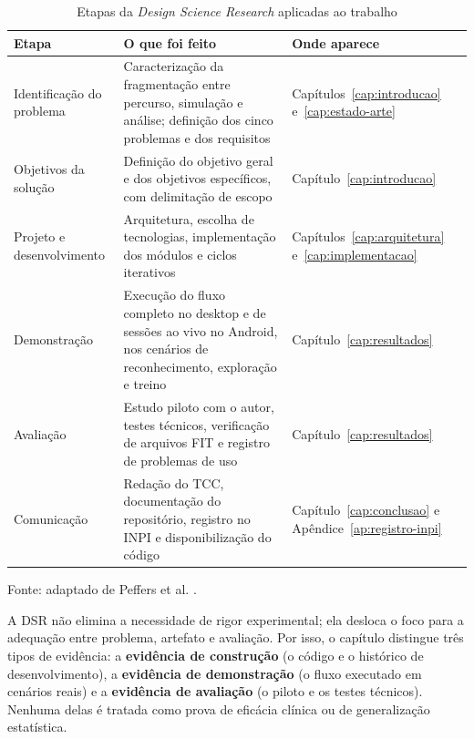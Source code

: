 \begin{table}[htbp]
    \centering
    \caption{Etapas da \textit{Design Science Research} aplicadas ao trabalho}
    \label{tab:dsr}
    \small
    \begin{tabular}{
        >{\raggedright\arraybackslash}p{3.4cm}
        >{\raggedright\arraybackslash}p{7.2cm}
        >{\raggedright\arraybackslash}p{4.0cm}
    }
        \toprule
        \textbf{Etapa} & \textbf{O que foi feito} & \textbf{Onde aparece} \\
        \midrule
        Identificação do problema &
        Caracterização da fragmentação entre percurso, simulação e análise;
        definição dos cinco problemas e dos requisitos &
        Capítulos~\ref{cap:introducao} e~\ref{cap:estado-arte} \\
        Objetivos da solução &
        Definição do objetivo geral e dos objetivos específicos, com
        delimitação de escopo &
        Capítulo~\ref{cap:introducao} \\
        Projeto e desenvolvimento &
        Arquitetura, escolha de tecnologias, implementação dos módulos e
        ciclos iterativos &
        Capítulos~\ref{cap:arquitetura} e~\ref{cap:implementacao} \\
        Demonstração &
        Execução do fluxo completo no desktop e de sessões ao vivo no Android,
        nos cenários de reconhecimento, exploração e treino &
        Capítulo~\ref{cap:resultados} \\
        Avaliação &
        Estudo piloto com o autor, testes técnicos, verificação de arquivos
        FIT e registro de problemas de uso &
        Capítulo~\ref{cap:resultados} \\
        Comunicação &
        Redação do TCC, documentação do repositório, registro no INPI e
        disponibilização do código &
        Capítulo~\ref{cap:conclusao} e Apêndice~\ref{ap:registro-inpi} \\
        \bottomrule
    \end{tabular}
    \vspace{0.2cm}
    \par\small Fonte: adaptado de Peffers et al. \cite{peffers2007}.
\end{table}

A DSR não elimina a necessidade de rigor experimental; ela desloca o foco para a
adequação entre problema, artefato e avaliação. Por isso, o capítulo distingue
três tipos de evidência: a \textbf{evidência de construção} (o código e o
histórico de desenvolvimento), a \textbf{evidência de demonstração} (o fluxo
executado em cenários reais) e a \textbf{evidência de avaliação} (o piloto e os
testes técnicos). Nenhuma delas é tratada como prova de eficácia clínica ou de
generalização estatística.

